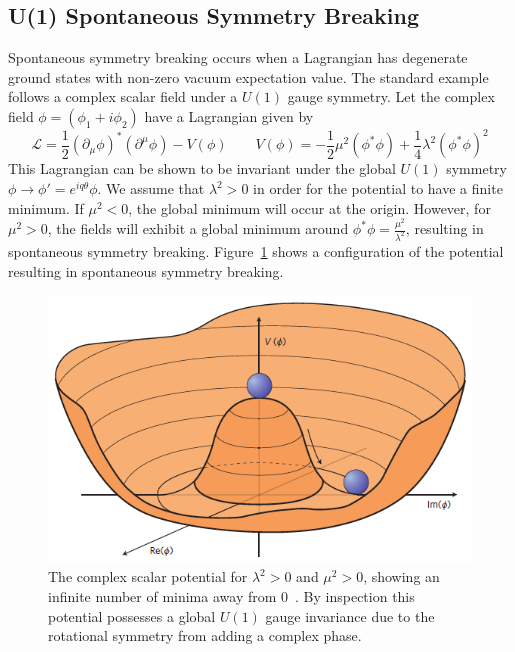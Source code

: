 \subsection{U(1) Spontaneous Symmetry Breaking} \label{sec:sm_theory_ssb}
Spontaneous symmetry breaking occurs when a Lagrangian has degenerate ground states with non-zero vacuum expectation value. The standard example follows a complex scalar field under a $U(1)$ gauge symmetry. Let the complex field $\phi=(\phi_1+i\phi_2)$ have a Lagrangian given by
\begin{equation}
	\mathcal{L}=\frac{1}{2}(\partial_\mu\phi)^*(\partial^\mu\phi)-V(\phi) \qquad V(\phi)=-\frac{1}{2}\mu^2(\phi^*\phi)+\frac{1}{4}\lambda^2(\phi^*\phi)^2
\end{equation}
This Lagrangian can be shown to be invariant under the global $U(1)$ symmetry $\phi\to\phi'= e^{iq\theta}\phi$. We assume that $\lambda^2>0$ in order for the potential to have a finite minimum. If $\mu^2<0$, the global minimum will occur at the origin. However, for $\mu^2>0$, the fields will exhibit a global minimum around $\phi^*\phi=\frac{\mu^2}{\lambda^2}$, resulting in spontaneous symmetry breaking. Figure~\ref{fig:higgs_ssb} shows a configuration of the potential resulting in spontaneous symmetry breaking.
\begin{figure}[htb!]
	\centering
	\includegraphics[width=0.65\linewidth]{figs/02_theory/higgspotential.png}
	\caption[The complex scalar potential for $\lambda^2>0$ and $\mu^2>0$, showing an infinite number of minima away from 0. By inspection this potential possesses a global $U(1)$ gauge invariance due to the rotational symmetry from adding a complex phase.]{The complex scalar potential for $\lambda^2>0$ and $\mu^2>0$, showing an infinite number of minima away from 0~\cite{higgspotential}. By inspection this potential possesses a global $U(1)$ gauge invariance due to the rotational symmetry from adding a complex phase.}
	\label{fig:higgs_ssb}
\end{figure}

